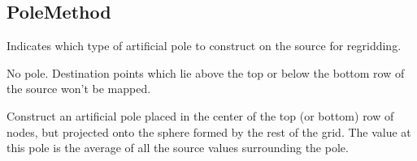 \documentclass[letterpaper,10pt,english]{sphinxmanual}
\begin{document}
\subsection{PoleMethod}
\label{\detokenize{PoleMethod:polemethod}}\label{\detokenize{PoleMethod::doc}}

\begin{fulllineitems}
\label{\detokenize{PoleMethod:ESMF.api.constants.PoleMethod}}
Indicates which type of artificial pole to construct on the source
{\hyperref[\detokenize{grid:ESMF.api.grid.Grid}]{}} for regridding.

\begin{fulllineitems}
\label{\detokenize{PoleMethod:ESMF.api.constants.PoleMethod.NONE}}
No pole. Destination points which lie above the top or below the bottom row
of the source {\hyperref[\detokenize{grid:ESMF.api.grid.Grid}]{}} won’t be mapped.

\end{fulllineitems}


\begin{fulllineitems}
\label{\detokenize{PoleMethod:ESMF.api.constants.PoleMethod.ALLAVG}}
Construct an artificial pole placed in the center of the top (or bottom)
row of nodes, but projected onto the sphere formed by the rest of the grid.
The value at this pole is the average of all the source values surrounding
the pole.


\end{fulllineitems}
\end{fulllineitems}
\end{document}
